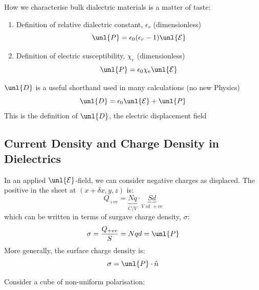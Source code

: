\documentclass[a4paper, 11pt, normalem]{report}
\newcommand\E{\mathcal{E}}
\newcommand\uE{\unl{\E}}
\newcommand\eno{\epsilon_0}
\newcommand\hn{\hat{n}}
\newcommand\er{\epsilon_r}
\begin{document}
How we characterise bulk dialectric materials is a matter of taste:
\begin{enumerate}
    \item Definition of relative dialectric constant, $\er$ (dimensionless)
    \begin{equation*}
        \unl{P} = \eno(\er - 1)\uE
    \end{equation*}
    \item Definition of electric susceptibility, $\chi_e$ (dimensionless)
    \begin{equation*}
        \unl{P} = \eno\chi_e\uE
    \end{equation*}
\end{enumerate}
$\unl{D}$ is a useful shorthand used in many calculations (no new Physics)
\begin{equation*}
    \unl{D} = \eno\uE + \unl{P}
\end{equation*}
This is the definition of $\unl{D}$, the electric displacement field

\subsection{Current Density and Charge Density in Dielectrics}
In an applied $\uE$-field, we can consider negative charges as displaced.
The positive in the sheet at $(x+\delta x, y, z)$ is:
\begin{equation*}
    Q_{+ve} = \underbrace{Nq}_{C/V} \cdot \underbrace{Sd}_{V \text{ of }+ve}
\end{equation*}
which can be written in terms of surgave charge density, $\sigma$:
\begin{equation*}
    \sigma = \frac{Q_{+ve}}{S} = Nqd = \unl{P}
\end{equation*}
More generally, the surface charge density is:
\begin{equation*}
    \sigma = \unl{P}\cdot\hn
\end{equation*}

Consider a cube of non-uniform polarisation:
\end{document}
